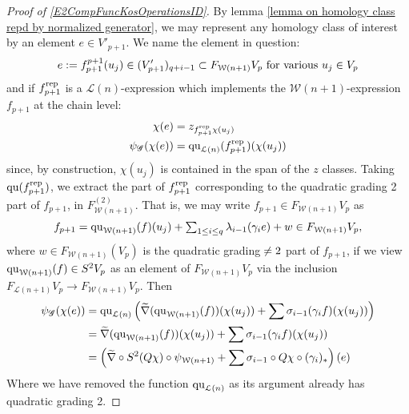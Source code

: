 \documentclass[11pt]{amsart}
\theoremstyle{plain}
\theoremstyle{definition}
\renewcommand{\to}{\longrightarrow}
\newcommand{\scrG}{\mathscr{G}}
\newcommand{\calW}{\mathcal{W}}
\newcommand{\calL}{\mathcal{L}}
\theoremstyle{plain}
\newcommand{\BSW}{{\scrG}}
\newcommand{\quadratic}{\textup{qu}}
\begin{document}
\begin{Composite functor spectral sequences}
\begin{tricky proofs of operation compatibilities}
\begin{proof}[Proof of \ref{E2CompFuncKosOperationsID}]
By lemma \ref{lemma on homology class repd by normalized generator}, we may represent any homology class of interest by an element $e\in V'_{p+1}$. We name the element in question:
\[e:=f^{p+1}_{p+1}(u_j)\in (V'_{p+1})_{q+i-1}\subset F_{\calW(n+1)}V_p\textup{ for various }u_j\in V_{p}\]
and if $f_{p+1}^\textup{rep}$ is a $\calL(n)$-expression which implements the $\calW(n+1)$-expression $f_{p+1}$ at the chain level:
\begin{alignat*}{2}
\chi(e)&=z_{f_{p+1}^\textup{rep}\chi(u_j)}\\
\psi_{\BSW}(\chi(e))&=\quadratic_{\calL(n)}(f_{p+1}^\textup{rep})(\chi(u_j))
\end{alignat*}
since, by construction, $\chi(u_j)$ is contained in the span of the $z$ classes.  Taking $\quadratic(f_{p+1}^\textup{rep})$, we extract the part of $f_{p+1}^\textup{rep}$ corresponding to the quadratic grading 2 part of $f_{p+1}$, in $F_{\calW(n+1)}^{(2)}$. That is, we may write $f_{p+1}\in F_{\calW(n+1)}V_p$ as
\[f_{p+1}=\quadratic_{\calW(n+1)}(f)(u_j)+\textstyle\sum_{1\leq i\leq q} \lambda_{i-1}(\gamma_ie) + w\in F_{\calW(n+1)}V_p,\]
where $w\in F_{\calW(n+1)}(V_p)$ is the quadratic grading$\makebox[0cm][l]{}\neq2$ part of $f_{p+1}$, if we view $\quadratic_{\calW(n+1)}(f)\in S^2V_p$ as an element of $F_{\calW(n+1)}V_p$ via the inclusion $F_{\calL(n+1)}V_p\to F_{\calW(n+1)}V_p$. Then
\begin{alignat*}{2}
\psi_\BSW(\chi(e))&=\quadratic_{\calL(n)} \left(\widetilde{\nabla}(\quadratic_{\calW(n+1)}(f))(\chi(u_j))+\sum \sigma_{i-1}(\gamma_if)(\chi(u_j))\right)\\
&=\widetilde{\nabla}(\quadratic_{\calW(n+1)}(f))(\chi(u_j))+\sum \sigma_{i-1}(\gamma_if)(\chi(u_j))\\
&=\left(\widetilde{\nabla}\circ S^2(Q\chi)\circ \psi_{\calW(n+1)}+\sum\sigma_{i-1}\circ Q\chi\circ(\gamma_i)_*\right)(e)
\end{alignat*}
Where we have removed the function $\quadratic_{\calL(n)}$ as its argument already has quadratic grading 2.
\end{proof}


\end{tricky proofs of operation compatibilities}
\end{Composite functor spectral sequences}
\end{document}
